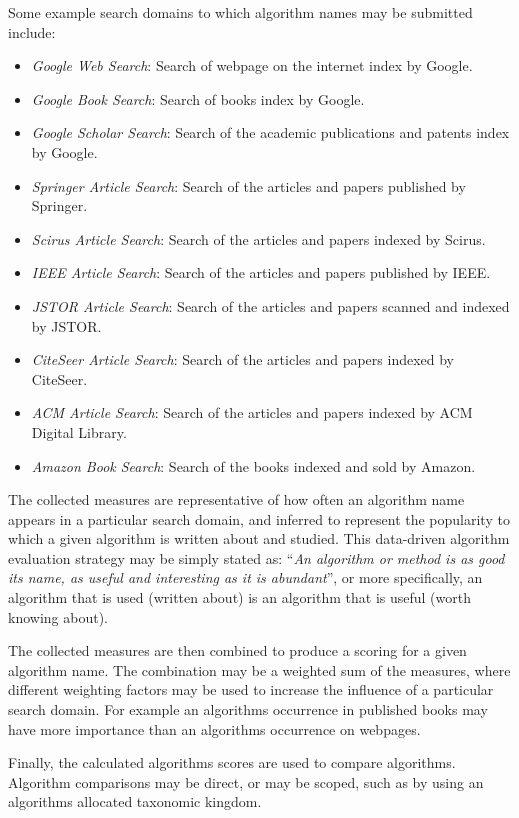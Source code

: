\documentclass[a4paper, 11pt]{article}
\begin{document}
Some example search domains to which algorithm names may be submitted include:
\begin{itemize}
	\item \emph{Google Web Search}: Search of webpage on the internet index by Google.
	\item \emph{Google Book Search}: Search of books index by Google.
	\item \emph{Google Scholar Search}: Search of the academic publications and patents index by Google.
	\item \emph{Springer Article Search}: Search of the articles and papers published by Springer.
	\item \emph{Scirus Article Search}: Search of the articles and papers indexed by Scirus.
	\item \emph{IEEE Article Search}: Search of the articles and papers published by IEEE.
	\item \emph{JSTOR Article Search}: Search of the articles and papers scanned and indexed by JSTOR.
	\item \emph{CiteSeer Article Search}: Search of the articles and papers indexed by CiteSeer.
	\item \emph{ACM Article Search}: Search of the articles and papers indexed by ACM Digital Library.
	\item \emph{Amazon Book Search}: Search of the books indexed and sold by Amazon.
\end{itemize}

The collected measures are representative of how often an algorithm name appears in a particular search domain, and inferred to represent the popularity to which a given algorithm is written about and studied. This data-driven algorithm evaluation strategy may be simply stated as: ``\emph{An algorithm or method is as good its name, as useful and interesting as it is abundant}'', or more specifically, an algorithm that is used (written about) is an algorithm that is useful (worth knowing about). 

The collected measures are then combined to produce a scoring for a given algorithm name. The combination may be a weighted sum of the measures, where different weighting factors may be used to increase the influence of a particular search domain. For example an algorithms occurrence in published books may have more importance than an algorithms occurrence on webpages. 

Finally, the calculated algorithms scores are used to compare algorithms. Algorithm comparisons may be direct, or may be scoped, such as by using an algorithms allocated taxonomic kingdom.
\end{document}
